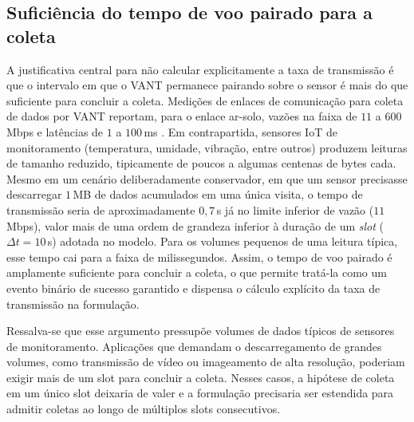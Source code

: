 \subsection{Suficiência do tempo de voo pairado para a coleta}
A justificativa central para não calcular explicitamente a taxa de transmissão é que o intervalo em que o VANT permanece pairando sobre o sensor é mais do que suficiente para concluir a coleta. Medições de enlaces de comunicação para coleta de dados por VANT reportam, para o enlace ar-solo, vazões na faixa de $11$ a $600$\,Mbps e latências de $1$ a $100$\,ms \cite[Tabela~5]{messaoudi2023survey}. Em contrapartida, sensores IoT de monitoramento (temperatura, umidade, vibração, entre outros) produzem leituras de tamanho reduzido, tipicamente de poucos a algumas centenas de bytes cada. Mesmo em um cenário deliberadamente conservador, em que um sensor precisasse descarregar $1$\,MB de dados acumulados em uma única visita, o tempo de transmissão seria de aproximadamente $0{,}7$\,s já no limite inferior de vazão ($11$\,Mbps), valor mais de uma ordem de grandeza inferior à duração de um \emph{slot} ($\Delta t = 10$\,s) adotada no modelo. Para os volumes pequenos de uma leitura típica, esse tempo cai para a faixa de milissegundos. Assim, o tempo de voo pairado é amplamente suficiente para concluir a coleta, o que permite tratá-la como um evento binário de sucesso garantido e dispensa o cálculo explícito da taxa de transmissão na formulação.

Ressalva-se que esse argumento pressupõe volumes de dados típicos de sensores de monitoramento. Aplicações que demandam o descarregamento de grandes volumes, como transmissão de vídeo ou imageamento de alta resolução, poderiam exigir mais de um slot para concluir a coleta. Nesses casos, a hipótese de coleta em um único slot deixaria de valer e a formulação precisaria ser estendida para admitir coletas ao longo de múltiplos slots consecutivos.

